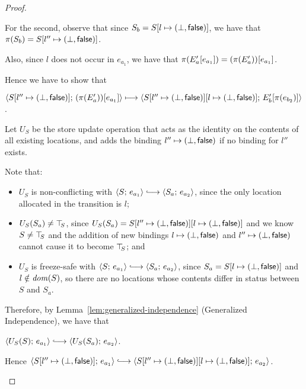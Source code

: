 \begin{proof}
\begin{enumerate}
\begin{enumerate}
\begin{itemize}
        For the second, observe that since $S_b =
        S[l \mapsto (\bot, \textsf{false})]$, we have that $\pi(S_b) =
        S[l'' \mapsto (\bot, \textsf{false})]$.

        Also, since $l$ does not occur in $e_{a_1}$, we have that
        $\pi(E'_a\hspace{-0.5mm}\left[e_{a_1}\right]) =
        (\pi(E'_a))\hspace{-0.5mm}\left[e_{a_1}\right]$.

        Hence we have to show that

        $\langle S[l'' \mapsto (\bot, \textsf{false})];\, (\pi(E'_a))\hspace{-0.5mm}\left[e_{a_1}\right] \rangle
        \longmapsto \\
        \langle S[l'' \mapsto (\bot, \textsf{false})][l \mapsto (\bot, \textsf{false})];\, E'_b\hspace{-0.5mm}\left[\pi(e_{b_2})\right] \rangle$.

        Let $U_S$ be the store update operation that acts as the
        identity on the contents of all existing locations, and adds
        the binding $l'' \mapsto (\bot, \textsf{false})$ if no
        binding for $l''$ exists.

        Note that:
        \begin{itemize}
        \item $U_S$ is non-conflicting with $\config{S}{e_{a_1}}
          \parstepsto \config{S_a}{e_{a_2}}$, since the only
          location allocated in the transition is $l$;
        \item $U_S(S_a) \neq \top\hspace{-0.85mm}_{S}$, since $U_S(S_a) =
          S[l'' \mapsto (\bot, \textsf{false})][l \mapsto (\bot, \textsf{false})]$
          and we know $S \neq \top\hspace{-0.85mm}_{S}$ and the addition of new
          bindings $l \mapsto (\bot, \textsf{false})$ and
          $l'' \mapsto (\bot, \textsf{false})$ cannot cause it
          to become $\top\hspace{-0.85mm}_{S}$; and
        \item $U_S$ is freeze-safe with $\config{S}{e_{a_1}}
          \parstepsto \config{S_a}{e_{a_2}}$, since $S_a =
          S[l \mapsto (\bot, \textsf{false})]$ and $l \notin \mathit{dom}(S)$,
          so there are no locations whose contents differ in status
          between $S$ and $S_a$.
        \end{itemize}

        Therefore, by Lemma~\ref{lem:generalized-independence}
        (Generalized Independence), we have that

        $\config{U_S(S)}{e_{a_1}} \parstepsto
        \config{U_S(S_a)}{e_{a_2}}$.

        Hence $\config{\extS{S}{l''}{\bot}{\frozenfalse}}{e_{a_1}}
        \parstepsto
        \config{\extS{\extS{S}{l''}{\bot}{\frozenfalse}}{l}{\bot}{\frozenfalse}}{e_{a_2}}$.


\end{itemize}
\end{enumerate}
\end{enumerate}
\end{proof}
